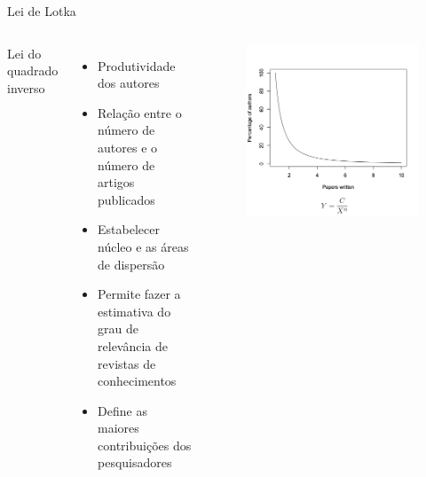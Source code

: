 \begin{frame}{Lei de Lotka}

	\begin{columns}
		Lei do quadrado inverso
		\begin{itemize}
			\item Produtividade dos autores	
			\item Relação entre o número de autores e o número de artigos publicados
			\item Estabelecer núcleo e as áreas de dispersão 
			\item Permite fazer a estimativa do grau de relevância de revistas de conhecimentos
			\item Define as maiores contribuições dos pesquisadores
		\end{itemize}
		\begin{figure}[hb]
			\includegraphics[width=1\textwidth]{figures/lokta.png}
		\end{figure}
	\end{columns}

\end{frame}

